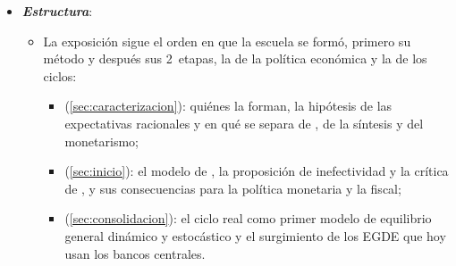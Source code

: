 \documentclass[11pt]{article}
\begin{document}
\begin{itemize}
\item \textbf{\emph{Estructura}}:
  \begin{itemize}
  \item La exposición sigue el orden en que la escuela se formó, primero su método y después sus 2~etapas, la de la política económica y la de los ciclos:
  \begin{itemize}
  \item {} (\ref{sec:caracterizacion}): quiénes la forman, la hipótesis de las expectativas racionales y en qué se separa de , de la síntesis y del monetarismo;
  \item {} (\ref{sec:inicio}): el modelo de , la proposición de inefectividad y la crítica de , y sus consecuencias para la política monetaria y la fiscal;
  \item {} (\ref{sec:consolidacion}): el ciclo real como primer modelo de equilibrio general dinámico y estocástico y el surgimiento de los EGDE que hoy usan los bancos centrales.
  \end{itemize}
  \end{itemize}
\end{itemize}
\end{document}
